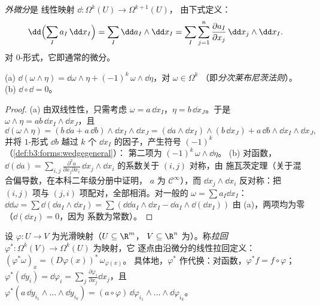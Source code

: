 \begin{definition}[外微分]\label{def:b3:forms:d}
\emph{外微分}是
线性映射 $\dd\colon \Omega^k(U) \to \Omega^{k+1}(U)$，
由下式定义：
\[
\dd\Bigl(\sum_I a_I\,\dd x_I\Bigr)
= \sum_I \dd a_I \wedge \dd x_I
= \sum_I\sum_{j=1}^n \frac{\partial a_I}{\partial
x_j}\,\dd x_j \wedge \dd x_I .
\]
对 $0$-形式，它即通常的微分。
\end{definition}

\begin{theorem}\label{thm:b3:forms:dsquare}
(a) $\dd(\omega \wedge \eta) = \dd\omega \wedge \eta +
(-1)^k\,\omega \wedge \dd\eta$，对 $\omega \in \Omega^k$
（即\emph{分次莱布尼茨法则}）。
(b) $\dd \circ \dd = 0$。
\end{theorem}

\begin{proof}
(a) 由双线性性，只需考虑 $\omega = a\,\dd
x_I$，$\eta = b\,\dd x_J$。于是 $\omega \wedge \eta =
ab\,\dd x_I \wedge \dd x_J$，且
\[
\dd(\omega\wedge\eta) = (b\,\dd a + a\,\dd b) \wedge \dd x_I
\wedge \dd x_J
= (\dd a \wedge \dd x_I) \wedge (b\,\dd x_J) +
a\,\dd b \wedge \dd x_I \wedge \dd x_J,
\]
并将 $1$-形式 $\dd b$ 越过 $k$ 个 $\dd
x_I$ 的因子，产生符号 $(-1)^k$（\cref{def:b3:forms:wedgegeneral}）：
第二项为 $(-1)^k\,\omega \wedge \dd\eta$。
(b) 对函数，$\dd(\dd a) = \sum_{i,j}
\frac{\partial^2a}{\partial x_j\partial x_i}\,\dd x_j \wedge
\dd x_i$ 的系数关于 $(i,j)$ 对称，由
施瓦茨定理（关于混合偏导数，在本科二年级分册中证明，
$a$ 为 $\mathcal C^\infty$），而 $\dd x_j \wedge
\dd x_i$ 反对称：把 $(i,j)$ 项与
$(j,i)$ 项配对，全部相消。对一般的 $\omega = \sum
a_I\dd x_I$：$\dd\dd\omega = \sum\dd(\dd a_I \wedge \dd x_I)
= \sum(\dd\dd a_I\wedge\dd x_I - \dd a_I\wedge\dd(\dd x_I))$
由 (a)，两项均为零（$\dd(\dd x_I) = 0$，因为
系数为常数）。
\end{proof}

\begin{definition}[拉回]\label{def:b3:forms:pullback}
设 $\varphi\colon U \to V$ 为光滑映射（$U \subseteq \R^m$，
$V \subseteq \R^n$ 为）。称\emph{拉回}
$\varphi^*\colon \Omega^k(V) \to \Omega^k(U)$ 为映射，它
逐点由沿微分的线性拉回定义：
$(\varphi^*\omega)_x = (D\varphi(x))^*\,\omega_{\varphi(x)}$。
具体地，$\varphi^*$ 作代换：对函数，$\varphi^*f = f \circ
\varphi$；$\varphi^*(\dd y_i) =
\dd\varphi_i = \sum_j\frac{\partial\varphi_i}{\partial
x_j}\dd x_j$，且 $\varphi^*(a\,\dd y_{i_1}\wedge\dots\wedge
\dd y_{i_k}) =
(a\circ\varphi)\,\dd\varphi_{i_1}\wedge\dots\wedge
\dd\varphi_{i_k}$。
\end{definition}

